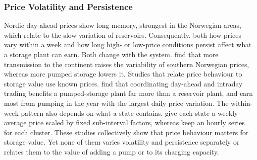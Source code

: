 \subsubsection{Price Volatility and Persistence}
\label{sec:lit_unc_price}

Nordic day-ahead prices show long memory, strongest in the Norwegian areas,
which \citet{haldrup2006regime} relate to the slow variation of reservoirs.
Consequently, both how prices vary within a week and how long high- or
low-price conditions persist affect what a storage plant can earn. Both
change with the system. \citet{henden2016economic} find that more
transmission to the continent raises the variability of southern Norwegian
prices, whereas more pumped storage lowers it.
Studies that relate price behaviour to storage value use known prices.
\citet{lohndorf2023} find that coordinating day-ahead and intraday trading
benefits a pumped-storage plant far more than a reservoir plant, and
\citet{ak2019quantifying} earn most from pumping in the year with the
largest daily price variation.
The within-week pattern also depends on what a state contains.
\citet{alic2023optimal} give each state a weekly average price scaled by
fixed sub-interval factors, whereas \citet{bore2026assessing} keep an
hourly series for each cluster.
These studies collectively show that price behaviour matters for storage
value. Yet none of them varies volatility and persistence separately or
relates them to the value of adding a pump or to its charging capacity.
